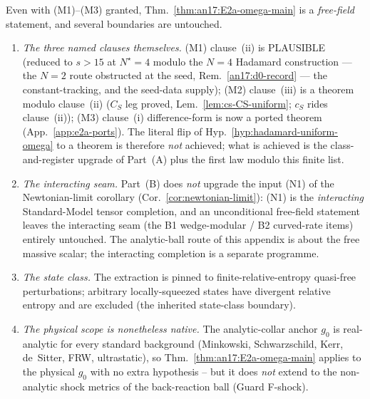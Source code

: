 \begin{remark}\label{rem:an17-open}
Even with (M1)--(M3) granted, Thm.~\ref{thm:an17:E2a-omega-main} is a
\emph{free-field} statement, and several boundaries are untouched.
\begin{enumerate}[label=\textup{(\alph*)},leftmargin=*]
  \item \emph{The three named clauses themselves.}  (M1) clause~(ii) is
    PLAUSIBLE (reduced to $s>15$ at $N^\star{=}4$ modulo the $N=4$
    Hadamard construction --- the $N=2$ route obstructed at the seed,
    Rem.~\ref{an17:d0-record} --- the constant-tracking, and the
    seed-data supply); (M2) clause~(iii)
    is a theorem modulo clause~(ii) ($C_S$ leg proved,
    Lem.~\ref{lem:cs-CS-uniform}; $c_S$ rides clause~(ii)); (M3)
    clause~(i) difference-form is now a ported theorem
    (App.~\ref{app:e2a-ports}).
    The literal flip of Hyp.~\ref{hyp:hadamard-uniform-omega} to a
    theorem is therefore \emph{not} achieved; what is achieved is the
    class-and-register upgrade of Part~(A) plus the first law modulo this
    finite list.
  \item \emph{The interacting seam.}  Part~(B) does \emph{not} upgrade
    the input (N1) of the Newtonian-limit corollary
    (Cor.~\ref{cor:newtonian-limit}): (N1) is the \emph{interacting}
    Standard-Model tensor completion, and an unconditional free-field
    statement leaves the interacting seam (the B1 wedge-modular / B2
    curved-rate items) entirely untouched.  The analytic-ball route of
    this appendix is about the free massive scalar; the interacting
    completion is a separate programme.
  \item \emph{The state class.}  The extraction is pinned to
    finite-relative-entropy quasi-free perturbations; arbitrary
    locally-squeezed states have divergent relative entropy and are
    excluded (the inherited state-class boundary).
  \item \emph{The physical scope is nonetheless native.}  The
    analytic-collar anchor $g_0$ is real-analytic for every standard
    background (Minkowski, Schwarzschild, Kerr, de~Sitter, FRW,
    ultrastatic), so Thm.~\ref{thm:an17:E2a-omega-main} applies to the
    physical $g_0$ with no extra hypothesis -- but it does \emph{not}
    extend to the non-analytic shock metrics of the back-reaction ball
    (Guard F-shock).
\end{enumerate}
\end{remark}

